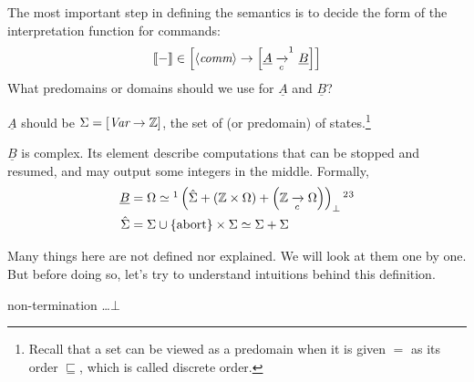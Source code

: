 \begin{enumcirc}
	\item
	The most important step in defining the semantics is to decide the form of the
	interpretation function for commands:
	\[
		\bbrackets{-} \in \brackets{\chevrons{\textit{comm}} \to \brackets{\underline{A} \toc^{\footnotemark} \underline{B}}}
	\]
	What predomains or domains should we use for $\underline{A}$ and
	$\underline{B}$?
	\item
	$\underline{A}$ should be $\Sigma = \left[ \textit{Var} \to \mathbb{Z} \right]$,
	the set of (or predomain) of states.\footnote{
		\begin{minipage}{0.8\textwidth}
			\vspace{0.2em}
			Recall that a set can be viewed
			as a predomain when it is given $=$ as its order $\sqsubseteq$, which is called
			discrete order.
			\vspace{0.2em}
		\end{minipage}
	}
	\item
	$\underline{B}$ is complex.
	Its element describe computations that can be stopped and resumed, and may
	output some integers in the middle.
	Formally,
	\begin{align*}
		\underline{B} & = \Omega \simeq\footnotemark \prths{\hat{\Sigma} + \prths{\Z \times \Omega} + \prths{\Z \toc \Omega}}_\bot
		\footnotemark \footnotemark                                                                                                \\
		\hat{\Sigma}  & = \Sigma \cup \braces{\abort} \times \Sigma \simeq \Sigma + \Sigma
	\end{align*}
	\item
	Many things here are not defined nor explained.
	We will look at them one by one.
	But before doing so, let's try to understand intuitions behind this definition.
	\begin{enumrm}
		\item
		non-termination \dots $\bot$

\end{enumrm}
\end{enumcirc}
